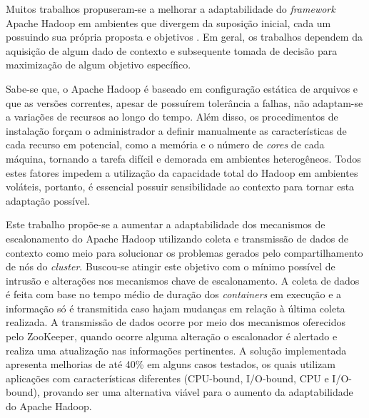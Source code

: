 Muitos trabalhos propuseram-se a melhorar a adaptabilidade do \textit{framework} Apache Hadoop em ambientes que divergem da suposição inicial, cada um possuindo sua própria proposta e objetivos \cite{Kumar2012} \cite{Zaharia2008} \cite{Rasooli2012} \cite{Sandholm2010} \cite{3PGCIC}. Em geral, os trabalhos dependem da aquisição de algum dado de contexto e subsequente tomada de decisão para maximização de algum objetivo específico.

Sabe-se que, o Apache Hadoop é baseado em configuração estática de arquivos e que as versões correntes, apesar de possuírem tolerância a falhas, não adaptam-se a variações de recursos ao longo do tempo. Além disso, os procedimentos de instalação forçam o administrador a definir manualmente as características de cada recurso em potencial, como a memória e o número de \textit{cores} de cada máquina, tornando a tarefa difícil e demorada em ambientes heterogêneos. Todos estes fatores impedem a utilização da capacidade total do Hadoop em ambientes voláteis, portanto, é essencial possuir sensibilidade ao contexto para tornar esta adaptação possível.

Este trabalho propõe-se a aumentar a adaptabilidade dos mecanismos de escalonamento do Apache Hadoop utilizando coleta e transmissão de dados de contexto como meio para solucionar os problemas gerados pelo compartilhamento de nós do \textit{cluster}. Buscou-se atingir este objetivo com o mínimo possível de intrusão e alterações nos mecanismos chave de escalonamento. A coleta de dados é feita com base no tempo médio de duração dos \textit{containers} em execução e a informação só é transmitida caso hajam mudanças em relação à última coleta realizada. A transmissão de dados ocorre por meio dos mecanismos oferecidos pelo ZooKeeper, quando ocorre alguma alteração o escalonador é alertado e realiza uma atualização nas informações pertinentes. A solução implementada apresenta melhorias de até 40\% em alguns casos testados, os quais utilizam aplicações com características diferentes (CPU-bound, I/O-bound, CPU e I/O-bound), provando ser uma alternativa viável para o aumento da adaptabilidade do Apache Hadoop.

